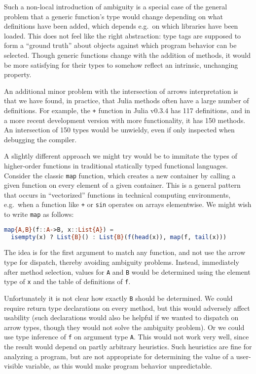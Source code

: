 
Such a non-local introduction of ambiguity is a special case of the
general problem that a generic function's type would change depending
on what definitions have been added, which depends e.g.\ on which libraries
have been loaded.
This does not feel like the right abstraction:
type tags are supposed to form a ``ground truth'' about objects against
which program behavior can be selected.
Though generic functions change with the addition of methods, it would be more
satisfying for their types to somehow reflect an intrinsic, unchanging
property.

An additional minor problem with the intersection of arrows
interpretation is that we have found, in practice, that Julia methods
often have a large number of definitions.
For example, the \texttt{+} function in Julia v0.3.4 has 117 definitions,
and in a more recent development version with more functionality, it has
150 methods.
An intersection of 150 types would be unwieldy, even if only
inspected when debugging the compiler.

A slightly different approach we might try would be to immitate
the types of higher-order functions in traditional
statically typed functional languages.
Consider the classic \texttt{map} function, which creates a new container
by calling a given function on every element of a given container.
This is a general pattern that occurs in ``vectorized'' functions in
technical computing environments, e.g.\ when a function like \texttt{+}
or \texttt{sin} operates on arrays elementwise.
We might wish to write \texttt{map} as follows:

\begin{singlespace}
\begin{lstlisting}[language=julia]
map{A,B}(f::A->B, x::List{A}) =
  isempty(x) ? List{B}() : List{B}(f(head(x)), map(f, tail(x)))
\end{lstlisting}
\end{singlespace}

The idea is for the first argument to match any function, and not use
the arrow type for dispatch, thereby avoiding ambiguity problems.
Instead, immediately after method selection, values for \texttt{A} and
\texttt{B} would be determined using the element type of \texttt{x}
and the table of definitions of \texttt{f}.

Unfortunately it is not clear how exactly \texttt{B} should be
determined. We could require return type declarations on every method,
but this would adversely affect usability (such declarations would also
be helpful if we wanted to dispatch on arrow types, though they would
not solve the ambiguity problem). Or we could use type inference
of \texttt{f} on argument type \texttt{A}. This would not work very
well, since the result would depend on partly arbitrary heuristics.
Such heuristics are fine for analyzing a program, but
are not appropriate for determining the value of a user-visible
variable, as this would make program behavior unpredictable.

